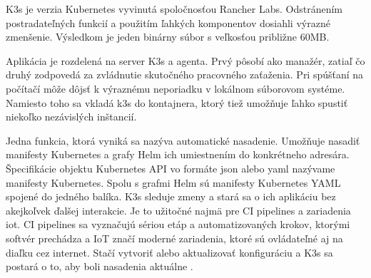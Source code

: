K3s je verzia Kubernetes vyvinutá spoločnosťou Rancher Labs. Odstránením postradateľných funkcií a použitím ľahkých komponentov dosiahli výrazné zmenšenie. Výsledkom je jeden binárny súbor s veľkosťou približne 60MB.

Aplikácia je rozdelená na server K3s a agenta. Prvý pôsobí ako manažér, zatiaľ čo druhý zodpovedá za zvládnutie skutočného pracovného zaťaženia. Pri spúšťaní na počítačí môže dôjsť k výraznému neporiadku v lokálnom súborovom systéme. Namiesto toho sa vkladá k3s do kontajnera, ktorý tiež umožňuje ľahko spustiť niekoľko nezávislých inštancií.

Jedna funkcia, ktorá vyniká sa nazýva automatické nasadenie. Umožňuje nasadiť manifesty Kubernetes a grafy Helm ich umiestnením do konkrétneho adresára. Špecifikácie objektu Kubernetes API vo formáte \acrshort{json} alebo \acrshort{yaml} nazývame manifesty Kubernetes. Spolu s grafmi Helm sú manifesty Kubernetes YAML spojené do jedného balíka. K3s sleduje zmeny a stará sa o ich aplikáciu bez akejkoľvek ďalšej interakcie. Je to užitočné najmä pre CI pipelines a zariadenia \acrshort{iot}. CI pipelines sa vyznačujú sériou etáp a automatizovaných krokov, ktorými softvér prechádza a IoT značí moderné zariadenia, ktoré sú ovládateľné aj na diaľku cez internet. Stačí vytvoriť alebo aktualizovať konfiguráciu a K3s sa postará o to, aby boli nasadenia aktuálne \cite{k3s}.

